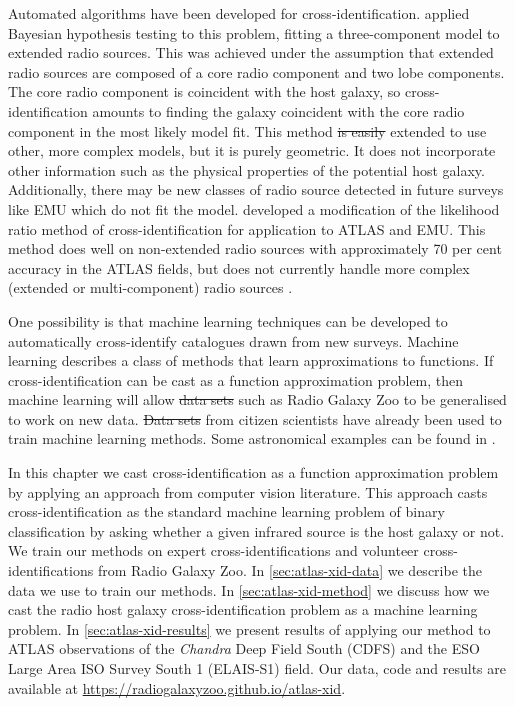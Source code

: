 \documentclass[11pt, a4paper]{book}
\providecommand{\DIFaddtex}[1]{{\protect\color{blue}\uwave{#1}}} %
\providecommand{\DIFdeltex}[1]{{\protect\color{red}\sout{#1}}}                      %
\providecommand{\DIFaddbegin}{} %
\providecommand{\DIFaddend}{} %
\providecommand{\DIFdelbegin}{} %
\providecommand{\DIFdelend}{} %
\providecommand{\DIFadd}[1]{\texorpdfstring{\DIFaddtex{#1}}{#1}} %
\providecommand{\DIFdel}[1]{\texorpdfstring{\DIFdeltex{#1}}{}} %
\newcommand{\DIFscaledelfig}{0.5}
\newlength{\DIFdelgraphicswidth} %
\newlength{\DIFdelgraphicsheight} %
\newcommand{\DIFaddincludegraphics}[2][]{{\color{blue}\fbox{\DIFOincludegraphics[#1]{#2}}}} %
\newcommand{\DIFdelincludegraphics}[2][]{%
\sbox{\DIFdelgraphicsbox}{\DIFOincludegraphics[#1]{#2}}%
\settoboxwidth{\DIFdelgraphicswidth}{\DIFdelgraphicsbox} %
\settoboxtotalheight{\DIFdelgraphicsheight}{\DIFdelgraphicsbox} %
\scalebox{\DIFscaledelfig}{%
\parbox[b]{\DIFdelgraphicswidth}{\usebox{\DIFdelgraphicsbox}\\[-\baselineskip] \rule{\DIFdelgraphicswidth}{0em}}\llap{\resizebox{\DIFdelgraphicswidth}{\DIFdelgraphicsheight}{%
\setlength{\unitlength}{\DIFdelgraphicswidth}%
\begin{picture}(1,1)%
\thicklines\linethickness{2pt} %
{\color[rgb]{1,0,0}\put(0,0){\framebox(1,1){}}}%
{\color[rgb]{1,0,0}\put(0,0){\line( 1,1){1}}}%
{\color[rgb]{1,0,0}\put(0,1){\line(1,-1){1}}}%
\end{picture}%
}\hspace*{3pt}}} %
} %
\DeclareRobustCommand{\DIFaddbegin}{\DIFOaddbegin \let\includegraphics\DIFaddincludegraphics} %
\DeclareRobustCommand{\DIFaddend}{\DIFOaddend \let\includegraphics\DIFOincludegraphics} %
\DeclareRobustCommand{\DIFdelbegin}{\DIFOdelbegin \let\includegraphics\DIFdelincludegraphics} %
\DeclareRobustCommand{\DIFdelend}{\DIFOaddend \let\includegraphics\DIFOincludegraphics} %
\begin{document}
    Automated algorithms have been developed for cross-identification.
    \citet{fan15} applied Bayesian
    hypothesis testing to this problem, fitting a three-component model to extended radio
    sources. This was achieved under the assumption that extended radio sources
    are composed of a core radio component and two lobe components. The core
    radio component is coincident with the host galaxy, so cross-identification
    amounts to finding the galaxy coincident with the core radio component in
    the most likely model fit. This method \DIFdelbegin \DIFdel{is easily }\DIFdelend \DIFaddbegin \DIFadd{could easily be }\DIFaddend extended to use other, more
    complex models, but it is purely geometric. It does not incorporate
    other information such as the physical properties of the potential host
    galaxy. Additionally, there may be new classes of radio source detected in
    future surveys like EMU which do not fit the model. \citet{weston18lrpy}
    developed a modification of the likelihood ratio method of
    cross-identification \citep{richter75likelihood} for application to ATLAS
    and EMU. This method does well on non-extended radio sources
    with approximately 70 per cent accuracy in the ATLAS fields, but does
    not currently handle more complex (extended or multi-component) radio sources
    \citep{norris17unexpected}.

    {One possibility is that machine learning techniques can
    be developed to automatically cross-identify catalogues drawn from new surveys}. Machine learning
    describes a class of methods that learn approximations to functions. {If
    cross-identification can be cast as a function approximation problem, then machine learning will allow \DIFdelbegin \DIFdel{data
    sets }\DIFdelend \DIFaddbegin \DIFadd{datasets
    }\DIFaddend such as Radio Galaxy Zoo to be generalised to work on new data. \DIFdelbegin \DIFdel{Data sets }\DIFdelend \DIFaddbegin \DIFadd{Datasets }\DIFaddend from
    citizen scientists have already been used to train machine learning methods.
    Some astronomical examples can be found in \citet{marshall15citizen}.}

    In this chapter we {cast cross-identification as a function
    approximation problem by} applying an approach from computer vision
    literature. This approach casts cross-identification as the standard machine
    learning problem of binary classification {by asking whether a given
    infrared source is the host galaxy or not}. We train our methods on expert
    cross-identifications and volunteer cross-identifications from Radio Galaxy Zoo. In
    \autoref{sec:atlas-xid-data} we describe the data we use to train our methods. In
    \autoref{sec:atlas-xid-method} we discuss how we cast the radio host galaxy
    cross-identification problem as a machine learning problem. In
    \autoref{sec:atlas-xid-results} we present results of applying our method to ATLAS
    observations of the \emph{Chandra} Deep Field South (CDFS) and the ESO Large Area ISO Survey South 1 (ELAIS-S1) field. Our data, code and results are
    available at \url{https://radiogalaxyzoo.github.io/atlas-xid}.
\end{document}
